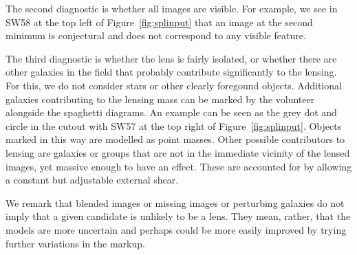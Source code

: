 The second diagnostic is whether all images are visible.  For example,
we see in SW58 at the top left of Figure~\ref{fig:splinput} that an
image at the second minimum is conjectural and does not correspond to
any visible feature.

The third diagnostic is whether the lens is fairly isolated, or
whether there are other galaxies in the field that probably contribute
significantly to the lensing.  For this, we do not consider stars or
other clearly foregound objects.  Additional galaxies contributing to
the lensing mass can be
marked by the volunteer alongside the spaghetti diagrams.  An example
can be seen as the grey dot and circle in the cutout with SW57 at the
top right of Figure~\ref{fig:splinput}.  Objects marked in this way
are modelled as point masses.  Other possible contributors to lensing
are galaxies or groups that are not in the immediate vicinity of
the lensed images, yet massive enough to have an effect.  These are
accounted for by allowing a constant but adjustable external shear.

We remark that blended images or missing images or perturbing galaxies
do not imply that a given candidate is unlikely to be a lens.  They
mean, rather, that the models are more uncertain and perhaps could be
more easily improved by trying further variations in the markup.

